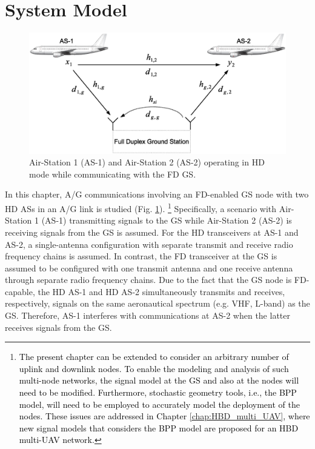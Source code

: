 \section{System Model}
\begin{figure} [tpb]
\centering
\includegraphics [width=0.6\columnwidth]{chap3_fig/block_diagram.eps} 
\vspace{-2cm}
\caption{Air-Station 1 (AS-1) and Air-Station 2 (AS-2) operating in HD mode while communicating with the FD GS.}
\label{fig:interference_management_HBD_ACS_1}
\end{figure}

In this chapter, A/G communications involving an FD-enabled GS node with two HD ASs in an A/G link is studied (Fig. \ref{fig:interference_management_HBD_ACS_1}). \textcolor{black}{\footnote{\textcolor{black}{The present chapter can be extended to consider an arbitrary number of uplink and downlink nodes. To enable the modeling and analysis of such multi-node networks, the signal model at the GS and also at the nodes will need to be modified. Furthermore, stochastic geometry tools, i.e., the BPP model, will need to be employed to accurately model the deployment of the nodes. These issues are addressed in Chapter \ref{chap:HBD_multi_UAV}, where new signal models that considers the BPP model are proposed for an HBD multi-UAV network.}}} Specifically, a scenario with Air-Station 1 (AS-1) transmitting signals to the GS while Air-Station 2 (AS-2) is receiving signals from the GS is assumed. For the HD transceivers at AS-1 and AS-2, a single-antenna configuration with separate transmit and receive radio frequency chains is assumed. In contrast, the FD transceiver at the GS is assumed to be configured with one transmit antenna and one receive antenna through separate radio frequency chains. Due to the fact that the GS node is FD-capable, the HD AS-1 and HD AS-2 simultaneously transmits and receives, respectively, signals on the same aeronautical spectrum (e.g. VHF, L-band) as the GS. Therefore, AS-1 interferes with communications at AS-2 when the latter receives signals from the GS.

